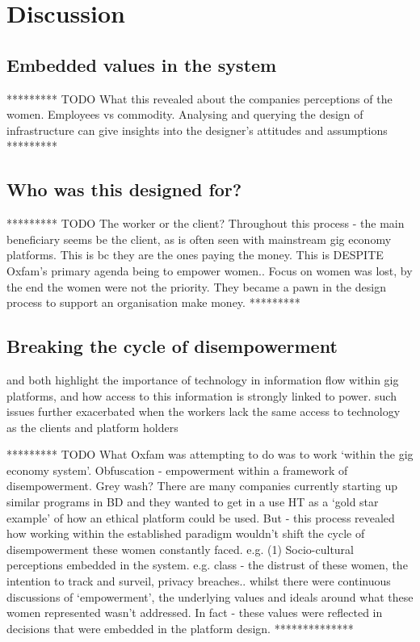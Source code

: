 \section{Discussion}

\subsection{Embedded values in the system}
********* TODO
What this revealed about the companies perceptions of the women. Employees vs commodity.
Analysing and querying the design of infrastructure can give insights into the designer's attitudes and assumptions \citep{Star1999} ********* 

\subsection{Who was this designed for?}
*********  TODO 
The worker or the client? 
Throughout this process - the main beneficiary seems be the client, as is often seen with mainstream gig economy platforms. This is bc they are the ones paying the money. This is DESPITE Oxfam’s primary agenda being to empower women.. Focus on women was lost, by the end the women were not the priority. They became a pawn in the design process to support an organisation make money. ********* 

\subsection{Breaking the cycle of disempowerment}

\cite{Hara2018} and \cite{martin2016} both highlight the importance of technology in information flow within gig platforms, and how access to this information is strongly linked to power. such issues further exacerbated when the workers lack the same access to technology as the clients and platform holders

********* TODO What Oxfam was attempting to do was to work ‘within the gig economy system’.  Obfuscation - empowerment within a framework of disempowerment. Grey wash? There are many companies currently starting up similar programs in BD and they wanted to get in a use HT as a ‘gold star example’ of how an ethical platform could be used. But - this process revealed how working within the established paradigm wouldn’t shift the cycle of disempowerment these women constantly faced. e.g. (1) Socio-cultural perceptions embedded in the system. e.g. class - the distrust of these women, the intention to track and surveil, privacy breaches.. whilst there were continuous discussions of ‘empowerment’, the underlying values and ideals around what these women represented wasn’t addressed. In fact - these values were reflected in decisions that were embedded in the platform design. **************


